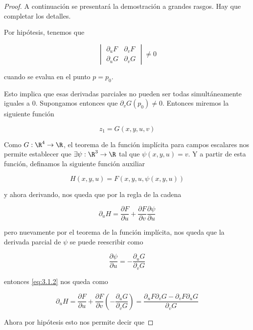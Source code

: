 \begin{proof}
    A continuación se presentará la demostración a grandes rasgos. Hay que completar los detalles.
    
    Por hipótesis, tenemos que
    
    \[
    \renewcommand\arraystretch{2}
    \begin{vmatrix}
        \partial_u F & \partial_v F \\
        \partial_u G & \partial_v G
    \end{vmatrix}
    \neq 0
    \]
    
    \noindent cuando se evalua en el punto $p = p_0$.
    
    Esto implica que esas derivadas parciales no pueden ser todas simultáneamente iguales a $0$. Supongamos entonces que $\partial_v G(p_0) \neq 0$. Entonces miremos la siguiente función
    
    \[
    z_1 = G(x,y,u,v)
    \]
    
    Como $G: \R^4 \rightarrow \R$, el teorema de la función implícita para campos escalares nos permite establecer que $\exists \psi: \R^3 \rightarrow \R$ tal que $\psi(x,y,u) = v$. Y a partir de esta función, definamos la siguiente función auxiliar
    
    \[
    H(x,y,u) = F\left( x,y,u,\psi(x,y,u) \right)
    \]
    
    \noindent y ahora derivando, nos queda que por la regla de la cadena
    
    \begin{equation}\label{eq:3.1.2}
        \partial_u H = \frac{\partial F}{\partial u} + \frac{\partial F}{\partial v} \frac{\partial \psi}{\partial u}
    \end{equation}
    
    \noindent pero nuevamente por el teorema de la función implícita, nos queda que la derivada parcial de $\psi$ se puede reescribir como
    
    \[
    \frac{\partial \psi}{\partial u} = - \frac{\partial_u G}{\partial_v G}
    \]
    
    \noindent entonces \ref{eq:3.1.2} nos queda como
    
    \[
    \partial_u H = \frac{\partial F}{\partial u} + \frac{\partial F}{\partial v} \left( -\frac{\partial_u G}{\partial_v G} \right) = \frac{\partial_uF \partial_vG - \partial_vF \partial_uG}{\partial_vG}
    \]
    
    Ahora por hipótesis esto nos permite decir que
    

\end{proof}
